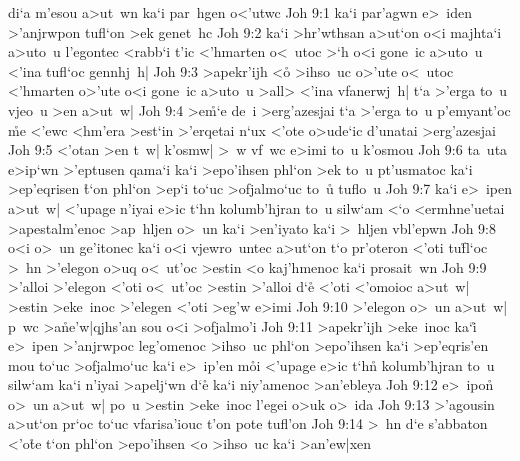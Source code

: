 di`a
m'esou
a>ut~wn
ka`i
par~hgen
o<'utwc\bibvsend
\vs Joh 9:1
ka`i
par'agwn
e>~iden
>'anjrwpon
tufl`on
>ek
genet~hc\bibvsend
\vs Joh 9:2
ka`i
>hr'wthsan
a>ut`on
o<i
majhta`i
a>uto~u
l'egontec
<rabb`i
t'ic
<'hmarten
o<~utoc
>`h
o<i
gone~ic
a>uto~u
<'ina
tufl`oc
gennhj~h|\bibvsend
\vs Joh 9:3
>apekr'ijh
<o\r{}
>ihso~uc
o>'ute
o<~utoc
<'hmarten
o>'ute
o<i
gone~ic
a>uto~u
>all>
<'ina
vfanerwj~h|
t`a
>'erga
to~u
vjeo~u
>en
a>ut~w|\bibvsend
\vs Joh 9:4
>e\r{m}`e
de~i
>erg'azesjai
t`a
>'erga
to~u
p'emyant'oc
\r{m}e
<'ewc
<hm'era
>est`in
>'erqetai
n`ux
<'ote
o>ude`ic
d'unatai
>erg'azesjai\bibvsend
\vs Joh 9:5
<'otan
>en
t~w|
k'osmw|
>~w
vf~wc
e>imi
to~u
k'osmou\bibvsend
\vs Joh 9:6
ta~uta
e>ip`wn
>'eptusen
qama`i
ka`i
>epo'ihsen
phl`on
>ek
to~u
pt'usmatoc
ka`i
>ep'eqrisen
\r{t}`on
phl`on
>ep`i
to`uc
>ofjalmo`uc
to~u\r{}
tuflo~u\bibvsend
\vs Joh 9:7
ka`i
e>~ipen
a>ut~w|
<'upage
n'iyai
e>ic
t`hn
kolumb'hjran
to~u
silw`am
<`o
<ermhne'uetai
>apestalm'enoc
>ap~hljen
o>~un
ka`i
>en'iyato
ka`i
>~hljen
vbl'epwn\bibvsend
\vs Joh 9:8
o<i
o>~un
ge'itonec
ka`i
o<i
vjewro~untec
a>ut`on
t`o
pr'oteron
<'oti
tu\r{f}l`oc
>~hn
>'elegon
o>uq
o<~ut'oc
>estin
<o
kaj'hmenoc
ka`i
prosait~wn\bibvsend
\vs Joh 9:9
>'alloi
>'elegon
<'oti
o<~ut'oc
>estin
>'alloi
d`e\r{}
<'oti
<'omoioc
a>ut~w|
>estin
>eke~inoc
>'elegen
<'oti
>eg'w
e>imi\bibvsend
\vs Joh 9:10
>'elegon
o>~un
a>ut~w|
p~wc
>a\r{n}e'w|qjhs'an
sou
o<i
>ofjalmo'i\bibvsend
\vs Joh 9:11
>apekr'ijh
>eke~inoc
ka`i\r{}
e>~ipen
>'anjrwpoc
leg'omenoc
>ihso~uc
phl`on
>epo'ihsen
ka`i
>ep'eqris'en
mou
to`uc
>ofjalmo`uc
ka`i
e>~ip'en
m\r{o}i
<'upage
e>ic
t`hn\r{}
kolumb'hjran
to~u
silw`am
ka`i
n'iyai
>apelj`wn
d`e\r{}
ka`i
niy'amenoc
>an'ebleya\bibvsend
\vs Joh 9:12
e>~ipon\r{}
o>~un
a>ut~w|
po~u
>estin
>eke~inoc
l'egei
o>uk
o>~ida\bibvsend
\vs Joh 9:13
>'agousin
a>ut`on
pr`oc
to`uc
vfarisa'iouc
t'on
pote
tufl'on\bibvsend
\vs Joh 9:14
>~hn
d`e
s'abbaton
<'o\r{t}e
t`on
phl`on
>epo'ihsen
<o
>ihso~uc
ka`i
>an'ew|xen
